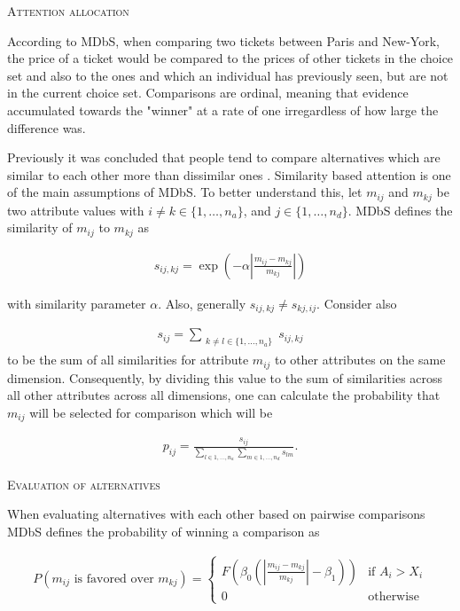 \documentclass[a4paper,12pt]{article}
\begin{document}
\textsc{Attention allocation}

According to MDbS, when comparing two tickets between Paris and New-York, the price of a ticket would be compared to the prices of other tickets in the choice set and also to the ones and which an individual has previously seen, but are not in the current choice set. Comparisons are ordinal, meaning that evidence accumulated towards the "winner" at a rate of one irregardless of how large the difference was. 

Previously it was concluded that people tend to compare alternatives which are similar to each other more than dissimilar ones \citep{noguchi2014attraction}. Similarity based attention is one of the main assumptions of MDbS. To better understand this, let $m_{ij}$ and $m_{kj}$ be two attribute values with $i \neq k \in \{1, \ldots, n_a\}$, and $j \in \{1, \ldots, n_d\}$. MDbS defines the similarity of $m_{ij}$ to $m_{kj}$ as

\begin{align}\label{similarityMDBS}
s_{ij,kj} = \exp \left( - \alpha \left| \frac{m_{ij} - m_{kj}}{m_{kj}} \right| \right) 
\end{align}

with similarity parameter $\alpha$. Also, generally $s_{ij,kj} \neq s_{kj,ij}.$ Consider also 

\begin{align}\label{sumOfSimilaritiesMDbS}
    s_{ij} = \sum_{\substack{k \neq l \in \{1, \ldots, n_a\}}} s_{ij,kj}
\end{align}
to be the sum of all similarities for attribute $m_{ij}$ to other attributes on the same dimension. Consequently, by dividing this value to the sum of similarities across all other attributes across all dimensions, one can calculate the probability that $m_{ij}$ will be selected for comparison which will be 

\begin{align}\label{probabilityOfComparison}
    p_{ij} = \frac{s_{ij}}{\sum_{l \in {1, \ldots, n_a}} \sum_{m \in {1, \ldots, n_d}} s_{lm}} .
\end{align}

\textsc{Evaluation of alternatives}

When evaluating alternatives with each other based on pairwise comparisons MDbS defines the probability of winning a comparison as 

\begin{align}\label{probabilityOneIsFavored}
    P(m_{ij} \text{ is favored over } m_{kj}) = 
        \begin{cases}
        F(\beta_0 (| \frac{m_{ij} - m_{kj}}{m_{kj}} |- \beta_1)) & \text{if } A_i > X_i \\
        0 & \text{otherwise}
        \end{cases}
\end{align}
\end{document}

